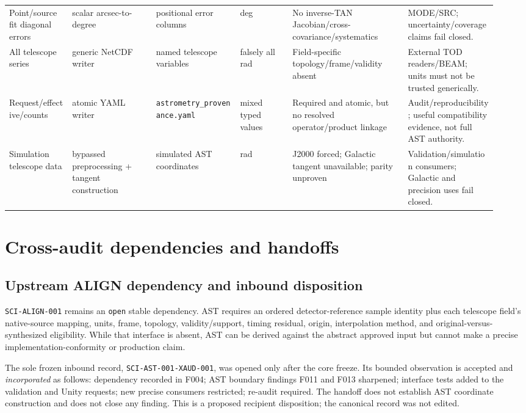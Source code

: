 \documentclass[11pt]{article}
\newcommand{\code}[1]{\nolinkurl{#1}}
\newcommand{\status}[1]{\nolinkurl{#1}}
\newcommand{\breakslash}{/\allowbreak}
\begin{document}
\begin{longtable}{L{0.12\linewidth}L{0.16\linewidth}L{0.16\linewidth}L{0.10\linewidth}L{0.22\linewidth}L{0.17\linewidth}}
Point/source fit diagonal errors & scalar arcsec-to-degree & positional error columns & deg & No inverse-TAN Jacobian/cross-covariance/systematics & MODE/SRC; uncertainty/coverage claims fail closed. \\
All telescope series & generic NetCDF writer & named telescope variables & falsely all rad & Field-specific topology/frame/validity absent & External TOD readers/BEAM; units must not be trusted generically. \\
Request\breakslash effective\breakslash counts & atomic YAML writer & \code{astrometry_provenance.yaml} & mixed typed values & Required and atomic, but no resolved operator\breakslash product linkage & Audit\breakslash reproducibility; useful compatibility evidence, not full AST authority. \\
Simulation telescope data & bypassed preprocessing + tangent construction & simulated AST coordinates & rad & J2000 forced; Galactic tangent unavailable; parity unproven & Validation/simulation consumers; Galactic and precision uses fail closed. \\
\bottomrule
\end{longtable}

\section{Cross-audit dependencies and handoffs}

\subsection{Upstream ALIGN dependency and inbound disposition}

\code{SCI-ALIGN-001} remains an \status{open} stable dependency. AST requires
an ordered detector-reference sample identity plus each telescope field's
native-source mapping, units, frame, topology, validity/support, timing
residual, origin, interpolation method, and original-versus-synthesized
eligibility. While that interface is absent, AST can be derived against the
abstract approved input but cannot make a precise implementation-conformity or
production claim.

The sole frozen inbound record, \code{SCI-AST-001-XAUD-001}, was opened only
after the core freeze. Its bounded observation is accepted and
\emph{incorporated} as follows: dependency recorded in F004; AST boundary
findings F011 and F013 sharpened; interface tests added to the validation and
Unity requests; new precise consumers restricted; re-audit required. The
handoff does not establish AST coordinate construction and does not close any
finding. This is a proposed recipient disposition; the canonical record was
not edited.
\end{document}
